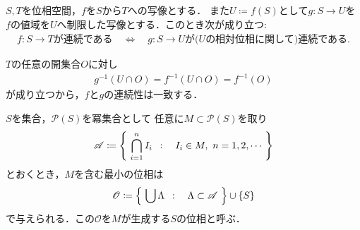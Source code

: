 	\begin{screen}
		\begin{thm}[部分空間と制限写像の連続性]
			$S,T$を位相空間，$f$を$S$から$T$への写像とする．
			また$U \coloneqq f(S)$として$g:S \longrightarrow U$を
			$f$の値域を$U$へ制限した写像とする．このとき次が成り立つ:
			\begin{align}
				\mbox{$f:S \longrightarrow T$が連続である} 
				\quad \Longleftrightarrow \quad
				\mbox{$g:S \longrightarrow U$が($U$の相対位相に関して)連続である}.
			\end{align}
		\end{thm}
	\end{screen}
	
	\begin{prf}
		$T$の任意の開集合$O$に対し
		\begin{align}
			g^{-1}(U \cap O) = f^{-1}(U \cap O) = f^{-1}(O)
		\end{align}
		が成り立つから，$f$と$g$の連続性は一致する．
		\QED
	\end{prf}
	
	\begin{screen}
		\begin{thm}[位相の生成]
			$S$を集合，$\mathcal{P}(S)$を冪集合として
			任意に$M \subset \mathcal{P}(S)$を取り
			\begin{align}
				\mathscr{A} \coloneqq
				\left\{\ \bigcap_{i=1}^n I_i\ \, : \quad I_i \in M,\ n = 1,2,\cdots\ \right\}
			\end{align}
			とおくとき，$M$を含む最小の位相は
			\begin{align}
				\mathscr{O} \coloneqq
				\left\{\ \bigcup \Lambda\ \, : \quad \Lambda \subset \mathscr{A}\ \right\}
				\cup \{S\}
			\end{align}
			で与えられる．この$\mathscr{O}$を$M$が生成する$S$の位相と呼ぶ．
		\end{thm}
	\end{screen}
	
